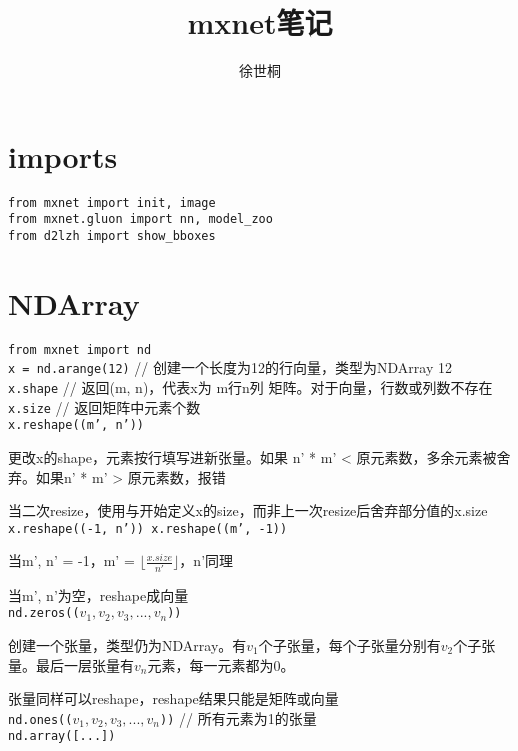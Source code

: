 \documentclass[UTF8]{ctexart}
\title{mxnet笔记}
\author{徐世桐}
\date{}
\begin{document}
\maketitle

\section{imports}
\noindent \texttt{from mxnet import init, image}\\
\texttt{from mxnet.gluon import nn, model\_zoo}\\
\texttt{from d2lzh import show\_bboxes}

\section{NDArray}

\noindent \texttt{from mxnet import nd}\\
\texttt{x = nd.arange(12)} // 创建一个长度为12的行向量，类型为NDArray 12\\
\texttt{x.shape} // 返回(m, n)，代表x为 m行n列 矩阵。对于向量，行数或列数不存在\\
\texttt{x.size} // 返回矩阵中元素个数\\
\texttt{x.reshape((m', n'))}

  更改x的shape，元素按行填写进新张量。如果 n' * m' < 原元素数，多余元素被舍弃。如果n' * m' > 原元素数，报错

  当二次resize，使用与开始定义x的size，而非上一次resize后舍弃部分值的x.size\\
\texttt{x.reshape((-1, n')) x.reshape((m', -1))}
 
  当m', n' = -1，m' = $\lfloor \frac{x.size}{n'}\rfloor $，n'同理

  当m', n'为空，reshape成向量\\
\texttt{nd.zeros(($v_1, v_2, v_3, ..., v_n$))}
  
  创建一个张量，类型仍为NDArray。有$v_1$个子张量，每个子张量分别有$v_2$个子张量。最后一层张量有$v_n$元素，每一元素都为0。
  
  张量同样可以reshape，reshape结果只能是矩阵或向量\\
\texttt{nd.ones(($v_1, v_2, v_3, ..., v_n$))} // 所有元素为1的张量\\
\texttt{nd.array([...])}
 
\end{document}
